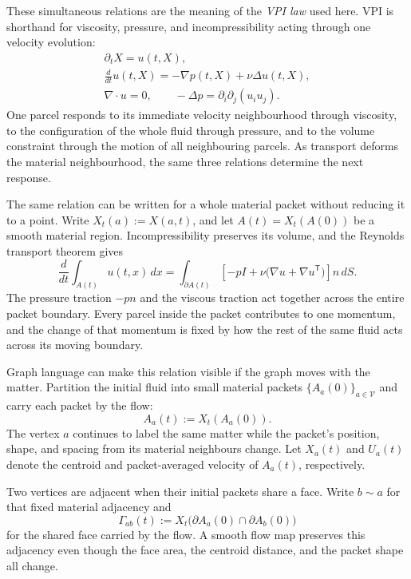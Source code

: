 These simultaneous relations are the meaning of the \emph{VPI law} used here.
VPI is shorthand for viscosity, pressure, and incompressibility acting through one velocity evolution:
\[
  \begin{gathered}
  \partial_tX=u(t,X),\\
  \frac{d}{dt}u(t,X)
  =
  -\nabla p(t,X)
  +
  \nu\Delta u(t,X),\\
  \nabla\cdot u=0,
  \qquad
  -\Delta p=\partial_i\partial_j(u_i u_j).
  \end{gathered}
\]
One parcel responds to its immediate velocity neighbourhood through viscosity, to the configuration of the whole fluid through pressure, and to the volume constraint through the motion of all neighbouring parcels.
As transport deforms the material neighbourhood, the same three relations determine the next response.

The same relation can be written for a whole material packet without reducing it to a point.
Write \(X_t(a):=X(a,t)\), and let \(A(t)=X_t(A(0))\) be a smooth material region.
Incompressibility preserves its volume, and the Reynolds transport theorem gives
\[
  \frac{d}{dt}\int_{A(t)}u(t,x)\,dx
  =
  \int_{\partial A(t)}
  \left[
    -pI
    +
    \nu\bigl(\nabla u+\nabla u^{\mathsf T}\bigr)
  \right]n\,dS.
\]
The pressure traction \(-pn\) and the viscous traction act together across the entire packet boundary.
Every parcel inside the packet contributes to one momentum, and the change of that momentum is fixed by how the rest of the same fluid acts across its moving boundary.


Graph language can make this relation visible if the graph moves with the matter.
Partition the initial fluid into small material packets \(\{A_a(0)\}_{a\in\mathcal V}\) and carry each packet by the flow:
\[
  A_a(t):=X_t(A_a(0)).
\]
The vertex \(a\) continues to label the same matter while the packet's position, shape, and spacing from its material neighbours change.
Let \(X_a(t)\) and \(U_a(t)\) denote the centroid and packet-averaged velocity of \(A_a(t)\), respectively.

Two vertices are adjacent when their initial packets share a face.
Write \(b\sim a\) for that fixed material adjacency and
\[
  \Gamma_{ab}(t)
  :=
  X_t\bigl(\partial A_a(0)\cap\partial A_b(0)\bigr)
\]
for the shared face carried by the flow.
A smooth flow map preserves this adjacency even though the face area, the centroid distance, and the packet shape all change.

